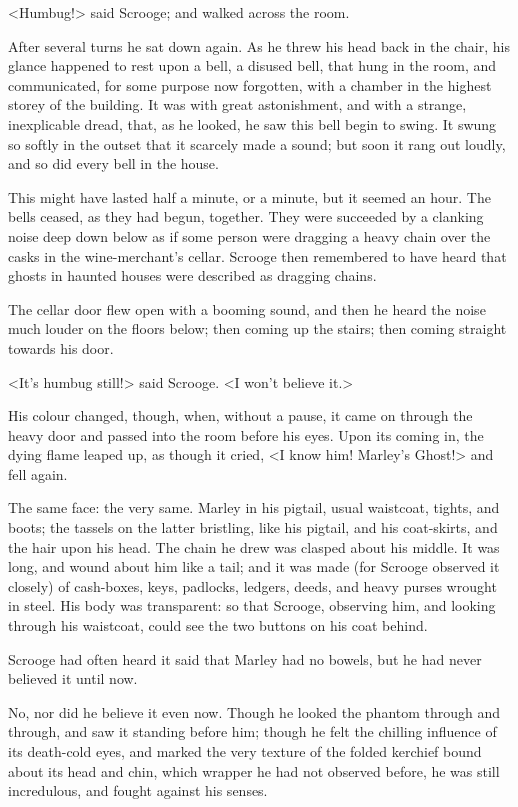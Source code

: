 <Humbug!> said Scrooge; and walked across the room.

After several turns he sat down again. As he threw his head back in the chair, his glance happened to rest upon a bell, a disused bell, that hung in the room, and communicated, for some purpose now forgotten, with a chamber in the highest storey of the building. It was with great astonishment, and with a strange, inexplicable dread, that, as he looked, he saw this bell begin to swing. It swung so softly in the outset that it scarcely made a sound; but soon it rang out loudly, and so did every bell in the house.

This might have lasted half a minute, or a minute, but it seemed an hour. The bells ceased, as they had begun, together. They were succeeded by a clanking noise deep down below as if some person were dragging a heavy chain over the casks in the wine-merchant's cellar. Scrooge then remembered to have heard that ghosts in haunted houses were described as dragging chains.

The cellar door flew open with a booming sound, and then he heard the noise much louder on the floors below; then coming up the stairs; then coming straight towards his door.

<It's humbug still!> said Scrooge. <I won't believe it.>

His colour changed, though, when, without a pause, it came on through the heavy door and passed into the room before his eyes. Upon its coming in, the dying flame leaped up, as though it cried, <I know him! Marley's Ghost!> and fell again.

The same face: the very same. Marley in his pigtail, usual waistcoat, tights, and boots; the tassels on the latter bristling, like his pigtail, and his coat-skirts, and the hair upon his head. The chain he drew was clasped about his middle. It was long, and wound about him like a tail; and it was made (for Scrooge observed it closely) of cash-boxes, keys, padlocks, ledgers, deeds, and heavy purses wrought in steel. His body was transparent: so that Scrooge, observing him, and looking through his waistcoat, could see the two buttons on his coat behind.

Scrooge had often heard it said that Marley had no bowels, but he had never believed it until now.

No, nor did he believe it even now. Though he looked the phantom through and through, and saw it standing before him; though he felt the chilling influence of its death-cold eyes, and marked the very texture of the folded kerchief bound about its head and chin, which wrapper he had not observed before, he was still incredulous, and fought against his senses.

